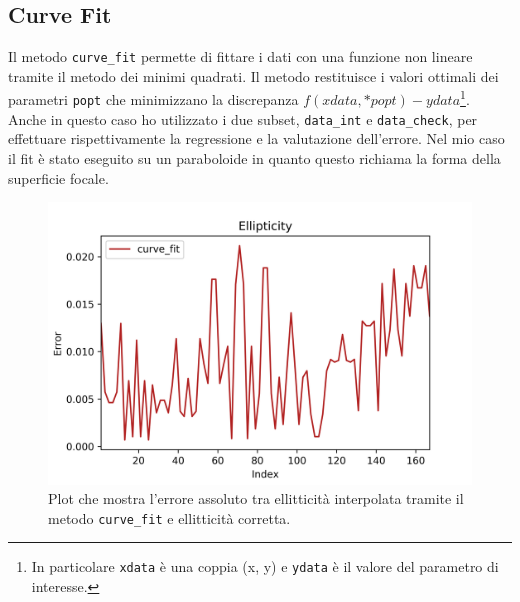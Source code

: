 \documentclass[12pt,a4paper,final]{book}
\begin{document}

\subsection{Curve Fit}\label{curve_fit}
Il metodo \texttt{curve\_fit} permette di fittare i dati con una funzione non lineare tramite il metodo dei minimi quadrati. Il metodo restituisce i valori ottimali dei parametri \texttt{popt} che minimizzano la discrepanza $f(xdata, *popt) - ydata$\footnote{In particolare \texttt{xdata} è una coppia (x, y) e \texttt{ydata} è il valore del parametro di interesse.}. Anche in questo caso ho utilizzato i due subset, \texttt{data\_int} e \texttt{data\_check}, per effettuare rispettivamente la regressione e la valutazione dell'errore. Nel mio caso il fit è stato eseguito su un paraboloide in quanto questo richiama la forma della superficie focale.
\begin{figure}
	\centering
	\includegraphics[scale=0.8]{../figures/error_curve_fit.png}
	\caption{Plot che mostra l'errore assoluto tra ellitticità interpolata tramite il metodo \texttt{curve\_fit} e ellitticità corretta.}
	\label{err_curve_fit}
\end{figure}

\end{document}
